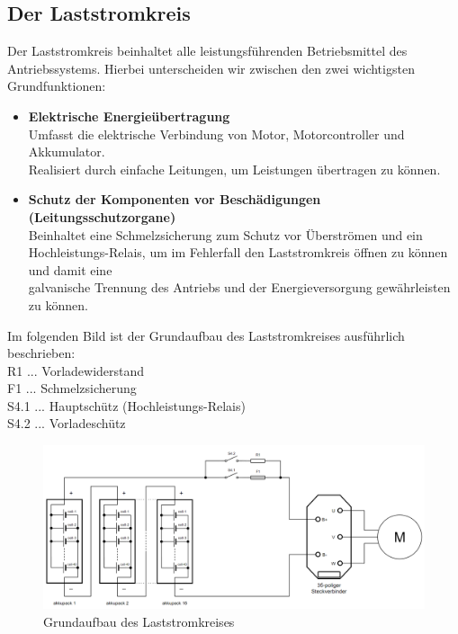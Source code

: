 \subsection{Der Laststromkreis}
Der Laststromkreis beinhaltet alle leistungsführenden Betriebsmittel des Antriebssystems. Hierbei unterscheiden wir zwischen den zwei wichtigsten Grundfunktionen:
\\[5mm]
\begin{itemize}
	\item \textbf{Elektrische Energieübertragung}
	\\ \medskip Umfasst die elektrische Verbindung von Motor, Motorcontroller und Akkumulator. 			\\ Realisiert durch einfache Leitungen, um Leistungen übertragen zu können.
	\medskip
	\item \textbf{Schutz der Komponenten vor Beschädigungen (Leitungsschutzorgane)}
	\\ \medskip Beinhaltet eine Schmelzsicherung zum Schutz vor Überströmen und ein 					\\ Hochleistungs-Relais, um im Fehlerfall den Laststromkreis öffnen zu können und damit eine  		
	\\ galvanische Trennung des Antriebs und der Energieversorgung gewährleisten zu können.
\end{itemize}
\vspace{5mm}

Im folgenden Bild ist der Grundaufbau des Laststromkreises ausführlich beschrieben:
\vspace{2mm}
\\R1 ... Vorladewiderstand
\\F1 ... Schmelzsicherung
\\S4.1 ... Hauptschütz (Hochleistungs-Relais)
\\S4.2 ... Vorladeschütz
\vspace{5mm}
\begin{figure}[H]
	\begin{center}
		\includegraphics[scale=0.35]{figures/Antrieb/Antrieb_Laststromkreis.png}
		\caption{Grundaufbau des Laststromkreises}
	\end{center}
\end{figure}

